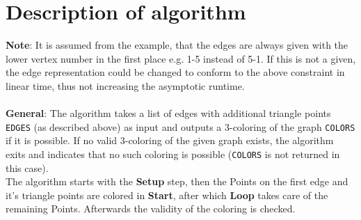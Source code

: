 \documentclass[english]{scrartcl}
\newcommand{\code}{\texttt}
\begin{document}
\section{Description of algorithm}
\label{sec:runtime}
\textbf{Note}: It is assumed from the example, that the edges are always given with the lower vertex number in the first place e.g. 1-5 instead of 5-1. If this is not a given, the edge representation could be changed to conform to the above constraint in linear time, thus not increasing the asymptotic runtime. 
\\ \\
\textbf{General}: The algorithm takes a list of edges with additional triangle points \code{EDGES} (as described above) as input and outputs a 3-coloring of the graph \code{COLORS} if it is possible. If no valid 3-coloring of the given graph exists, the algorithm exits and indicates that no such coloring is possible (\code{COLORS} is not returned in this case).
\\
The algorithm starts with the \textbf{Setup} step, then the Points on the first edge and it's triangle points are colored in \textbf{Start}, after which \textbf{Loop} takes care of the remaining Points. Afterwards the validity of the coloring is checked. 
\end{document}
